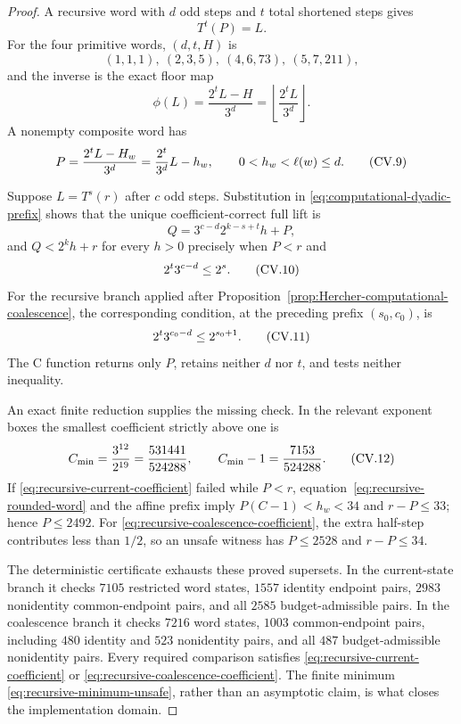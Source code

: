 \begin{proof}
A recursive word with $d$ odd steps and $t$ total shortened steps gives
\[
 T^t(P)=L.
\]
For the four primitive words, $(d,t,H)$ is
\[
 (1,1,1),\ (2,3,5),\ (4,6,73),\ (5,7,211),
\]
and the inverse is the exact floor map
\[
 \phi(L)=\frac{2^tL-H}{3^d}
         =\left\lfloor\frac{2^tL}{3^d}\right\rfloor.
\]
A nonempty composite word has
\begin{equation}
\stepcounter{equation}
\label{eq:recursive-rounded-word}
 P=\frac{2^tL-H_w}{3^d}=\frac{2^t}{3^d}L-h_w,
 \qquad0<h_w<\ell(w)\leq d.
\tag{CV.9}
\end{equation}

Suppose $L=T^s(r)$ after $c$ odd steps.  Substitution in
\eqref{eq:computational-dyadic-prefix} shows that the unique
coefficient-correct full lift is
\[
 Q=3^{c-d}2^{k-s+t}h+P,
\]
and $Q<2^kh+r$ for every $h>0$ precisely when $P<r$ and
\begin{equation}
\stepcounter{equation}
\label{eq:recursive-current-coefficient}
 2^t3^{c-d}\leq2^s.
\tag{CV.10}
\end{equation}
For the recursive branch applied after
Proposition~\ref{prop:Hercher-computational-coalescence}, the corresponding
condition, at the preceding prefix $(s_0,c_0)$, is
\begin{equation}
\stepcounter{equation}
\label{eq:recursive-coalescence-coefficient}
 2^t3^{c_0-d}\leq2^{s_0+1}.
\tag{CV.11}
\end{equation}
The C function returns only $P$, retains neither $d$ nor $t$, and tests
neither inequality.

An exact finite reduction supplies the missing check.  In the relevant
exponent boxes the smallest coefficient strictly above one is
\begin{equation}
\stepcounter{equation}
\label{eq:recursive-minimum-unsafe}
 C_{\min}=\frac{3^{12}}{2^{19}}
 =\frac{531441}{524288},
 \qquad C_{\min}-1=\frac{7153}{524288}.
\tag{CV.12}
\end{equation}
If \eqref{eq:recursive-current-coefficient} failed while $P<r$,
equation~\eqref{eq:recursive-rounded-word} and the affine prefix imply
$P(C-1)<h_w<34$ and $r-P\leq33$; hence $P\leq2492$.  For
\eqref{eq:recursive-coalescence-coefficient}, the extra half-step contributes
less than $1/2$, so an unsafe witness has $P\leq2528$ and $r-P\leq34$.

The deterministic certificate exhausts these proved supersets.  In the
current-state branch it checks $7105$ restricted word states, $1557$
identity endpoint pairs, $2983$ nonidentity common-endpoint pairs, and all
$2585$ budget-admissible pairs.  In the coalescence branch it checks $7216$
word states, $1003$ common-endpoint pairs, including $480$ identity and $523$
nonidentity pairs, and all $487$ budget-admissible nonidentity pairs.  Every
required comparison satisfies \eqref{eq:recursive-current-coefficient} or
\eqref{eq:recursive-coalescence-coefficient}.  The finite minimum
\eqref{eq:recursive-minimum-unsafe}, rather than an asymptotic claim, is what
closes the implementation domain.
\end{proof}

